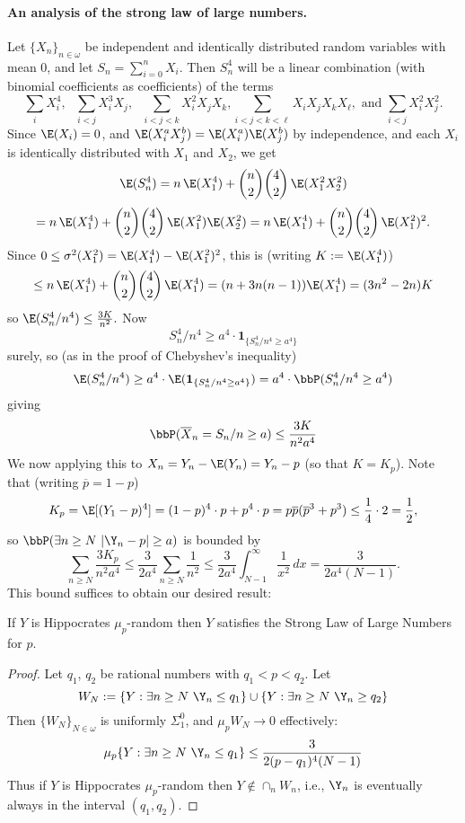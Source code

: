 \paragraph{An analysis of the strong law of large numbers.} Let $\{X_n\}_{n\in\omega}$ be independent and identically distributed random variables with mean 0, and let $S_n=\sum_{i=0}^n X_i$. Then $S_n^4$ will be a linear combination (with binomial coefficients as coefficients) of the terms
\[
\sum_i X_i^4, \text{ }
\sum_{i<j} X^3_iX_j, \text{  }
\sum_{i<j<k} X_i^2 X_j X_k,
\sum_{i<j<k<\ell} X_i X_j X_k X_\ell, \text{ and } \sum_{i<j} X_i^2 X_j^2.
\]
Since $\E(X_i)=0$, and $\E(X_i^aX_j^b)=\E(X_i^a)\E(X_j^b)$ by independence, and each $X_i$ is identically distributed with $X_1$ and $X_2$, we get 
\[
\E(S_n^4) = n \,\E(X_1^4) + {n\choose 2}{4\choose 2} \,\E(X_1^2X_2^2)
\]
\[
= n \,\E(X_1^4) + {n\choose 2}{4\choose 2} \,\E(X_1^2)\E(X_2^2)
= n \,\E(X_1^4) + {n\choose 2}{4\choose 2} \,\E(X_1^2)^2.
\]
Since $0\le\sigma^2(X_1^2) = \E(X_1^4)-\E(X_1^2)^2$, this is (writing $K:=\E(X_1^4)$)
\[
\le  n \,\E(X_1^4) + {n\choose 2}{4\choose 2} \,\E(X_1^4) = (n+3n(n-1)) \E(X_1^4) = (3n^2-2n) K
\]
so 
$%
\E(S_n^4/n^4) \le \frac{3K}{n^2}.
$ %
 Now 
\[
S_n^4/n^4 \ge a^4 \cdot \mathbf 1_{\{S_n^4/n^4\ge a^4\}}
\]
surely, so (as in the proof of Chebyshev's inequality)
\[
\E(S_n^4/n^4) \ge a^4 \cdot \E(\mathbf 1_{\{S_n^4/n^4\ge a^4\}}) = a^4\cdot \bbP( S_n^4/n^4\ge a^4)
\]
giving
\[
\bbP(\overline X_n = S_n/n \ge a) \le \frac{3K}{n^2 a^{4}}
\]
We now applying this to $X_n=Y_n-\E(Y_n) = Y_n - p$ (so that $K=K_p$). Note that (writing $\overline p=1-p$)
\[
K_p=\E[(Y_1-p)^4] = (1-p)^4\cdot p + p^4\cdot p = p\overline p ({\overline p}^3+p^3) \le \frac{1}{4}\cdot 2 = \frac{1}{2},
\]
so $\bbP(\exists n\ge N\,\, |\Y_n-p|\ge a)$ is bounded by 
\[
\sum_{n\ge N} \frac{3K_p}{n^2 a^4} \le \frac{3}{2a^4} \sum_{n\ge N} \frac{1}{n^2}
\le \frac{3}{2a^4} \int_{N-1}^\infty \frac{1}{x^2}\,dx = \frac{3}{2a^4(N-1)}.
\]
This bound suffices to obtain our desired result:

\begin{theorem}\label{satisfy_LLN}
If $Y$ is Hippocrates $\mu_p$-random then $Y$ satisfies the Strong Law of Large Numbers for $p$.
\end{theorem}
\begin{proof}
Let $q_1$, $q_2$ be rational numbers with $q_1<p<q_2$.
Let
\[
W_N:=\{Y: \exists n\ge N\,\,\Y_n\le q_1\}\cup\{Y: \exists n\ge N\,\,\Y_n\ge q_2\}
\]
Then $\{W_N\}_{N\in\omega}$ is uniformly $\Sigma^0_1$, and $\mu_p W_N\to 0$ effectively:
\[\mu_p \{Y: \exists n\ge N\,\,\Y_n\le q_1\} \le \frac{3}{2(p-q_1)^4(N-1)}\]
Thus if $Y$ is Hippocrates $\mu_p$-random then $Y\not\in\cap_n W_n$, i.e., $\Y_n$ is eventually always in the interval $(q_1,q_2)$. 
\end{proof}



